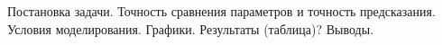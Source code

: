 Постановка задачи.
Точность сравнения параметров и точность предсказания.
Условия моделирования.
Графики.
Результаты (таблица)?
Выводы.




